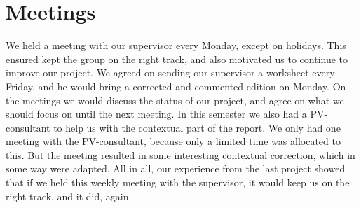 \section{Meetings}
We held a meeting with our supervisor every Monday, except on holidays. This ensured kept the group on the right track, and also motivated us to continue to improve our project. We agreed on sending our supervisor a worksheet every Friday, and he would bring a corrected and commented edition on Monday. On the meetings we would discuss the status of our project, and agree on what we should focus on until the next meeting. In this semester we also had a PV-consultant to help us with the contextual part of the report. We only had one meeting with the PV-consultant, because only a limited time was allocated to this. But the meeting resulted in some interesting contextual correction, which in some way were adapted. All in all, our experience from the last project showed that if we held this weekly meeting with the supervisor, it would keep us on the right track, and it did, again. 